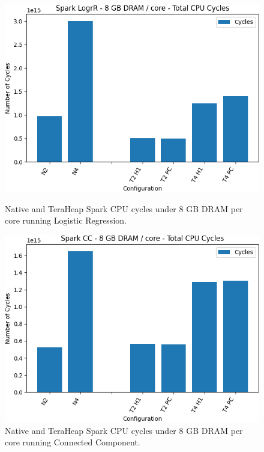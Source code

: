 \begin{figure}[thbp]
        \centering
        \includegraphics[width=\linewidth]{./fig/logr64_cycles.png}
    \caption{Native and TeraHeap Spark CPU cycles under 8 GB DRAM per core running Logistic Regression.}
                \label{fig:logr64_cycles}

        \includegraphics[width=\linewidth]{./fig/cc64_cycles.png}
    \caption{Native and TeraHeap Spark CPU cycles under 8 GB DRAM per core running Connected Component.}
                \label{fig:cc64_cycles}
\end{figure}

